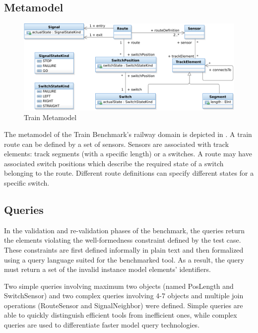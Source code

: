 \subsection{Metamodel}
\label{sec:domain}

\begin{figure}[htb!]
\begin{center}
\includegraphics[width=1\columnwidth]{figures/TrainMM.pdf}
\caption{Train Metamodel}
\label{fig:metamodel}
\end{center}
\end{figure}


The metamodel of the Train Benchmark's railway domain is depicted in . A train \textsf{route} can be defined by a set of \textsf{sensors}. Sensors are associated with \textsf{track elements}: track \textsf{segment}s (with a specific length) or a \textsf{switch}es. A route may have associated \textsf{switch positions} which describe the required state of a switch belonging to the route. Different route definitions can specify different states for a specific switch.
 
\subsection{Queries}
\label{sec:queries}

In the validation and re-validation phases of the benchmark, the queries return the elements violating the well-formedness constraint defined by the test case. These constraints are first defined informally in plain text and then formalized using a query language suited for the benchmarked tool. As a result, the query must return a set of the invalid instance model elements' identifiers.
 
Two simple queries involving maximum two objects (named \textsf{PosLength} and \textsf{SwitchSensor}) and two complex queries involving 4-7 objects and multiple join operations (\textsf{RouteSensor} and \textsf{SignalNeighbor}) were defined. Simple queries are able to quickly distinguish efficient tools from inefficient ones, while complex queries are used to differentiate faster model query technologies.
 
